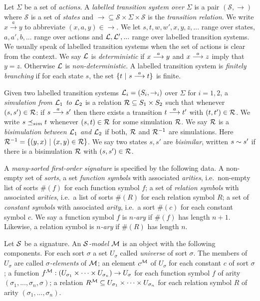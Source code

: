 Let $\Sigma$ be a set of \emph{actions}.  A \emph{labelled transition
  system over $\Sigma$} is a pair $(\mathcal{S}, \rightarrow)$ where
$\mathcal{S}$ is a set of \emph{states} and $\rightarrow \subseteq
\mathcal{S} \times \Sigma \times \mathcal{S}$ is the \emph{transition
  relation}.  We write $x \xrightarrow{a} y$ to abbreviate $(x,a,y)
\in \rightarrow$. We let $s, t, w, w', x, y, z, ...$ range over
states, $a, a', b, ...$ range over actions and $\mathcal{L}, \mathcal{L}', ...$
range over labelled transition systems. We usually speak of labelled
transition systems  when the set of actions is clear from the
context.  We say $\mathcal{L}$ is \emph{deterministic} if $x \stackrel{a}{\longrightarrow} y$ and
$x \stackrel{a}{\longrightarrow} z$ imply that $y = z$. Otherwise $\mathcal{L}$ is
\emph{non-deterministic}.  A labelled transition system is
\emph{finitely branching} if for each state $s$, the set $\{t\ |\ s
\stackrel{a}{\longrightarrow} t\}$ is finite.

Given two labelled transition systems $\mathcal{L}_i = (S_i, \rightarrow_i)$
over $\Sigma$ for $i = 1, 2$, a \emph{simulation from $\mathcal{L}_1$ to
  $\mathcal{L}_2$} is a relation $\mathcal{R} \subseteq S_1 \times S_2$ such that
whenever $(s, s') \in \mathcal{R}$: if $s \stackrel{a}{\longrightarrow} s'$ then there exists a
transition $t \stackrel{a}{\longrightarrow} t'$ with $(t, t') \in \mathcal{R}$.  We write $s \preceq_{sim}
t$ whenever $(s, t) \in \mathcal{R}$ for some simulation $\mathcal{R}$.  We say
$\mathcal{R}$ is a \emph{bisimulation between $\mathcal{L}_1$ and $\mathcal{L}_2$} if both,
$\mathcal{R}$ and $\mathcal{R}^{-1}$ are simulations. Here $\mathcal{R}^{-1} = \{(y,
x)\ |\ (x, y) \in \mathcal{R}\}$.  We say two states $s, s'$ are
\emph{bisimilar}, written $s \sim s'$ if there is a bisimulation
$\mathcal{R}$ with $(s, s') \in \mathcal{R}$.

A \emph{many-sorted first-order signature} is specified by the
following data.  A non-empty set of \emph{sorts}, a set \emph{function
  symbols} with associated \emph{arities}, i.e.~non-empty list of
sorts $\#(f)$ for each function symbol $f$; a set of \emph{relation
  symbols} with associated \emph{arities}, i.e.~a list of sorts
$\#(R)$ for each relation symbol $R$; a set of \emph{constant symbols}
with associated \emph{arity}, i.e.~a sort $\#(c)$ for each constant
symbol $c$. We say a function symbol $f$ is \emph{$n$-ary} if $\#(f)$
has length $n+1$. Likewise, a relation symbol is \emph{$n$-ary} if
$\#(R)$ has length $n$.

Let $\mathcal{S}$ be a signature. An \emph{$\mathcal{S}$-model} $\mathcal{M}$ is an
object with the following components.  For each sort $\sigma$ a set
$U_{\sigma}$ called \emph{universe} of sort $\sigma$.  The members of
$U_{\sigma}$ are called \emph{$\sigma$-elements} of $\mathcal{M}$; an
element $c^{\mathcal{M}}$ of $U_{\sigma}$ for each constant $c$ of sort
$\sigma$; a function $f^{\mathcal{M}} : (U_{\sigma_1}\times \dots \times
U_{\sigma_n}) \rightarrow U_{\sigma}$ for each function symbol $f$ of
arity $(\sigma_1, ..., \sigma_n, \sigma)$; a relation $R^{\mathcal{M}}
\subseteq U_{\sigma_1}\times \dots \times U_{\sigma_n}$ for each
relation symbol $R$ of arity $(\sigma_1, ..., \sigma_n)$.

